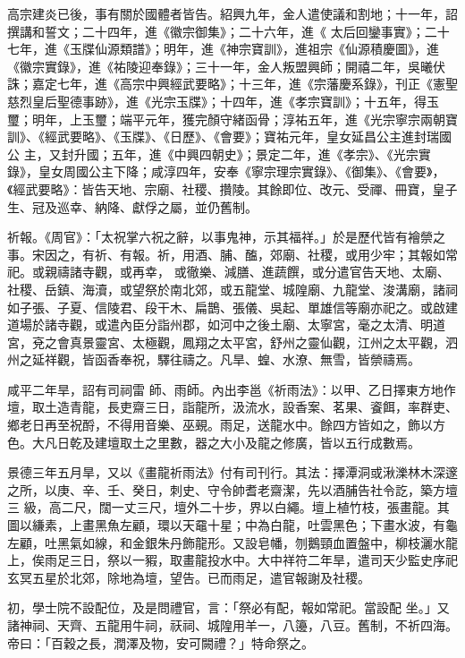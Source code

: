 \begin{pinyinscope}
 高宗建炎已後，事有關於國體者皆告。紹興九年，金人遣使議和割地；十一年，詔撰講和誓文；二十四年，進《徽宗御集》；二十六年，進《
 太后回鑾事實》；二十七年，進《玉牒仙源類譜》；明年，進《神宗寶訓》，進祖宗《仙源積慶圖》，進《徽宗實錄》，進《祐陵迎奉錄》；三十一年，金人叛盟興師；開禧二年，吳曦伏誅；嘉定七年，進《高宗中興經武要略》；十三年，進《宗藩慶系錄》，刊正《憲聖慈烈皇后聖德事跡》，進《光宗玉牒》；十四年，進《孝宗寶訓》；十五年，得玉璽；明年，上玉璽；端平元年，獲完顏守緒函骨；淳祐五年，進《光宗寧宗兩朝寶訓》、《經武要略》、《玉牒》、《日歷》、《會要》；寶祐元年，皇女延昌公主進封瑞國公
 主，又封升國；五年，進《中興四朝史》；景定二年，進《孝宗》、《光宗實錄》，皇女周國公主下降；咸淳四年，安奉《寧宗理宗實錄》、《御集》、《會要》，《經武要略》：皆告天地、宗廟、社稷、攢陵。其餘即位、改元、受禪、冊寶，皇子生、冠及巡幸、納降、獻俘之屬，並仍舊制。



 祈報。《周官》：「太祝掌六祝之辭，以事鬼神，示其福祥。」於是歷代皆有襘禜之事。宋因之，有祈、有報。祈，用酒、脯、醢，郊廟、社稷，或用少牢；其報如常祀。或親禱諸寺觀，或再幸，
 或徹樂、減膳、進蔬饌，或分遣官告天地、太廟、社稷、岳鎮、海瀆，或望祭於南北郊，或五龍堂、城隍廟、九龍堂、浚溝廟，諸祠如子張、子夏、信陵君、段干木、扁鵲、張儀、吳起、單雄信等廟亦祀之。或啟建道場於諸寺觀，或遣內臣分詣州郡，如河中之後土廟、太寧宮，毫之太清、明道宮，兗之會真景靈宮、太極觀，鳳翔之太平宮，舒州之靈仙觀，江州之太平觀，泗州之延祥觀，皆函香奉祝，驛往禱之。凡旱、蝗、水潦、無雪，皆禜禱焉。



 咸平二年旱，詔有司祠雷
 師、雨師。內出李邕《祈雨法》：以甲、乙日擇東方地作壇，取土造青龍，長吏齋三日，詣龍所，汲流水，設香案、茗果、餈餌，率群吏、鄉老日再至祝酹，不得用音樂、巫覡。雨足，送龍水中。餘四方皆如之，飾以方色。大凡日乾及建壇取土之里數，器之大小及龍之修廣，皆以五行成數焉。



 景德三年五月旱，又以《畫龍祈雨法》付有司刊行。其法：擇潭洞或湫濼林木深邃之所，以庚、辛、壬、癸日，刺史、守令帥耆老齋潔，先以酒脯告社令訖，築方壇三
 級，高二尺，闊一丈三尺，壇外二十步，界以白繩。壇上植竹枝，張畫龍。其圖以縑素，上畫黑魚左顧，環以天黿十星；中為白龍，吐雲黑色；下畫水波，有龜左顧，吐黑氣如線，和金銀朱丹飾龍形。又設皂幡，刎鵝頸血置盤中，柳枝灑水龍上，俟雨足三日，祭以一豭，取畫龍投水中。大中祥符二年旱，遣司天少監史序祀玄冥五星於北郊，除地為壇，望告。已而雨足，遣官報謝及社稷。



 初，學士院不設配位，及是問禮官，言：「祭必有配，報如常祀。當設配
 坐。」又諸神祠、天齊、五龍用牛祠，祆祠、城隍用羊一，八籩，八豆。舊制，不祈四海。帝曰：「百穀之長，潤澤及物，安可闕禮？」特命祭之。




\end{pinyinscope}
